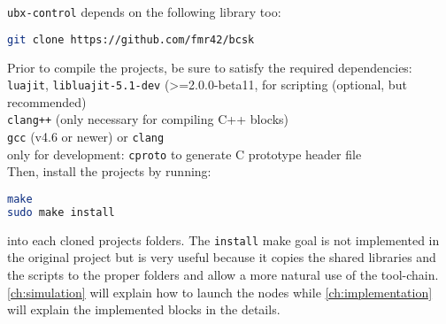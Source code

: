 \texttt{ubx-control} depends on the following library too:
\begin{lstlisting}[language=bash]
git clone https://github.com/fmr42/bcsk
\end{lstlisting}

Prior to compile the projects, be sure to satisfy the required dependencies:\\
\texttt{luajit}, \texttt{libluajit-5.1-dev} (>=2.0.0-beta11, for scripting (optional, but recommended)\\
\texttt{clang++} (only necessary for compiling C++ blocks)\\
\texttt{gcc} (v4.6 or newer) or \texttt{clang}\\
only for development: \texttt{cproto} to generate C prototype header file\\

Then, install the projects by running:
\begin{lstlisting}[language=bash]
make
sudo make install
\end{lstlisting}
into each cloned projects folders.
The \texttt{install} make goal is not implemented in the original project but is very useful because it copies the shared libraries and the scripts to the proper folders and allow a more natural use of the tool-chain.\\
\autoref{ch:simulation} will explain how to launch the nodes while \autoref{ch:implementation} will explain the implemented blocks in the details.



